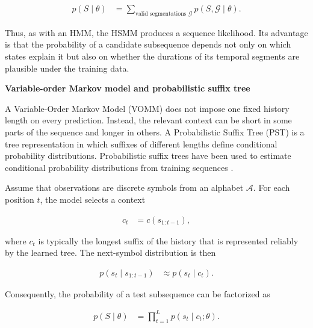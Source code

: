 \documentclass{book}
\providecommand{\ProjectDeepHeading}[2]{%
    \par\medskip\noindent\textbf{#2}\par\smallskip
}
\begin{document}
        \begin{align}
            p(S\mid\ensuremath{\theta})
            &=
            \sum_{\text{valid segmentations }\mathcal{G}}
            p(S,\mathcal{G}\mid\ensuremath{\theta}).
        \end{align}

        \noindent
        Thus, as with an HMM, the HSMM produces a sequence likelihood. Its advantage is that the probability of a candidate subsequence depends not only on which states explain it but also on whether the durations of its temporal segments are plausible under the training data.

    \ProjectDeepHeading{3}{Variable-order Markov model and probabilistic suffix tree}

        A Variable-Order Markov Model (VOMM) does not impose one fixed history length on every prediction. Instead, the relevant context can be short in some parts of the sequence and longer in others. A Probabilistic Suffix Tree (PST) is a tree representation in which suffixes of different lengths define conditional probability distributions. Probabilistic suffix trees have been used to estimate conditional probability distributions from training sequences \cite{pimentel-clifton-clifton-tarassenko-2014-a-review-of-novelty-detection}.

        Assume that observations are discrete symbols from an alphabet \(\mathcal{A}\). For each position \(t\), the model selects a context

        \begin{align}
            c_t
            &=
            c(s_{1:t-1}),
        \end{align}

        \noindent
        where \(c_t\) is typically the longest suffix of the history that is represented reliably by the learned tree. The next-symbol distribution is then

        \begin{align}
            p(s_t\mid s_{1:t-1})
            &\approx
            p(s_t\mid c_t).
        \end{align}

        \noindent
        Consequently, the probability of a test subsequence can be factorized as

        \begin{align}
            p(S\mid\ensuremath{\theta})
            &=
            \prod_{t=1}^{L}
            p(s_t\mid c_t;\ensuremath{\theta}).
        \end{align}
\end{document}

